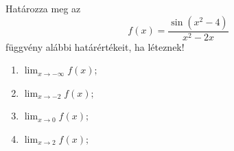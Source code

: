 \documentclass[11pt]{scrartcl}
\begin{document}
Határozza meg az
\[
	f(x) = \frac{\sin(x^2 - 4)}{x^2 - 2x}
\]
függvény alábbi határértékeit, ha léteznek!
\begin{enumerate}
	\item \(\displaystyle \lim_{x \to -\infty} f(x);\)

	\item \(\displaystyle \lim_{x \to -2} f(x);\)

	\item \(\displaystyle \lim_{x \to 0} f(x);\)

	\item \(\displaystyle \lim_{x \to 2} f(x);\)
\end{enumerate}
\end{document}
